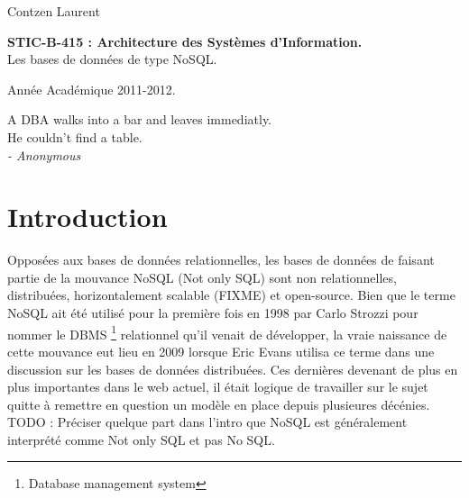 \documentclass[11pt]{article}
\author{Contzen Laurent}
\begin{document}
\begin{titlepage}  
  \begin{flushleft}
    Contzen Laurent
  \end{flushleft}
  \begin{center}
    \vspace{85mm}\LARGE{\textbf{STIC-B-415 : Architecture des Systèmes d'Information.} \\    
      Les bases de données de type NoSQL.}
  \end{center}
  \begin{flushright}
    \vspace{95mm}
    Année Académique 2011-2012.             
  \end{flushright}
\end{titlepage}

\tableofcontents
\newpage
\vspace*{\fill}
\begin{flushright}
  A DBA walks into a bar and leaves immediatly. \\
  He couldn't find a table. \\
  \textit{- Anonymous}
\end{flushright}
\vspace*{\fill}
\newpage

\section{Introduction}
Opposées aux bases de données relationnelles, les bases de données de faisant partie de la mouvance NoSQL (Not only SQL) sont non relationnelles, distribuées, horizontalement scalable (FIXME) et open-source. Bien que le terme NoSQL ait été utilisé pour la première fois en 1998 par Carlo Strozzi pour nommer le DBMS \footnote{Database management system} relationnel qu'il venait de développer, la vraie naissance de cette mouvance eut lieu en 2009 lorsque Eric Evans utilisa ce terme dans une discussion sur les bases de données distribuées. Ces dernières devenant de plus en plus importantes dans le web actuel, il était logique de travailler sur le sujet quitte à remettre en question un modèle en place depuis plusieures décénies. TODO : Préciser quelque part dans l'intro que NoSQL est généralement interprété comme Not only SQL et pas No SQL.
\end{document}

